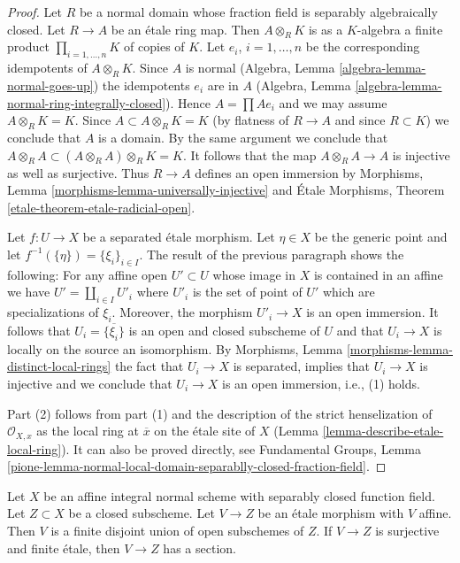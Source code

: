 \begin{proof}
Let $R$ be a normal domain whose fraction field is separably algebraically
closed. Let $R \to A$ be an \'etale ring map. Then
$A \otimes_R K$ is as a $K$-algebra a finite product
$\prod_{i = 1, \ldots, n} K$ of copies of $K$. Let $e_i$, $i = 1, \ldots, n$
be the corresponding idempotents of $A \otimes_R K$. Since $A$ is normal
(Algebra, Lemma \ref{algebra-lemma-normal-goes-up})
the idempotents $e_i$ are in $A$
(Algebra, Lemma \ref{algebra-lemma-normal-ring-integrally-closed}).
Hence $A = \prod Ae_i$ and we may assume $A \otimes_R K = K$.
Since $A \subset A \otimes_R K = K$ (by flatness of $R \to A$ and
since $R \subset K$) we conclude that $A$ is a domain.
By the same argument we conclude that
$A \otimes_R A \subset (A \otimes_R A) \otimes_R K = K$.
It follows that the map $A \otimes_R A \to A$ is
injective as well as surjective. Thus $R \to A$ defines an
open immersion by
Morphisms, Lemma \ref{morphisms-lemma-universally-injective}
and
\'Etale Morphisms, Theorem \ref{etale-theorem-etale-radicial-open}.

\medskip\noindent
Let $f : U \to X$ be a separated \'etale morphism. Let $\eta \in X$
be the generic point and let $f^{-1}(\{\eta\}) = \{\xi_i\}_{i \in I}$.
The result of the previous paragraph shows the following:
For any affine open $U' \subset U$ whose image in $X$ is contained in
an affine we have $U' = \coprod_{i \in I} U'_i$ where $U'_i$
is the set of point of $U'$ which are specializations of $\xi_i$.
Moreover, the morphism $U'_i \to X$ is an open immersion.
It follows that $U_i = \overline{\{\xi_i\}}$ is an open and closed
subscheme of $U$ and that $U_i \to X$ is locally on the source
an isomorphism. By Morphisms,
Lemma \ref{morphisms-lemma-distinct-local-rings}
the fact that $U_i \to X$ is separated, implies that
$U_i \to X$ is injective and we conclude that $U_i \to X$
is an open immersion, i.e., (1) holds.

\medskip\noindent
Part (2) follows from part (1) and the description of the strict
henselization of $\mathcal{O}_{X, x}$ as the local ring at $\overline{x}$
on the \'etale site of $X$ (Lemma \ref{lemma-describe-etale-local-ring}).
It can also be proved directly, see
Fundamental Groups, Lemma
\ref{pione-lemma-normal-local-domain-separablly-closed-fraction-field}.
\end{proof}

\begin{lemma}
\label{lemma-closed-of-affine-normal-scheme-with-alg-closed-function-field}
Let $X$ be an affine integral normal scheme with separably closed
function field. Let $Z \subset X$ be a closed subscheme. Let
$V \to Z$ be an \'etale morphism with $V$ affine. Then $V$ is a finite
disjoint union of open subschemes of $Z$. If $V \to Z$ is
surjective and finite \'etale, then $V \to Z$ has a section.
\end{lemma}

